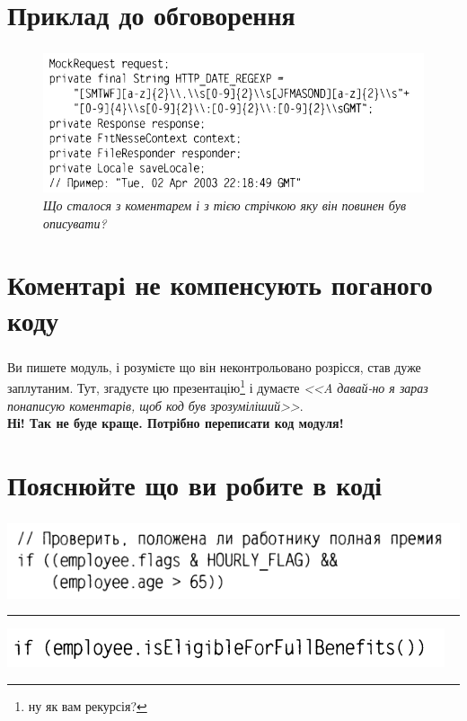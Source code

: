 \documentclass[12pt,pdf,utf8,ukrainian,aspectratio=169]{beamer}
\makeatletter
\newcommand*{\currentname}{\@currentlabelname}
\makeatother
\begin{document}
	\section{Приклад до обговорення} 
	\begin{frame}\frametitle{\currentname}
		\begin{figure}
			\includegraphics[scale=0.8]{clean_code_1.png} 
			\newline \newline
			\textit{Що сталося з коментарем і з тією стрічкою яку він повинен був описувати?}
		\end{figure}
	\end{frame}

	\section{Коментарі не компенсують поганого коду}
	\begin{frame}\frametitle{\currentname} 
		\begin{block}
			{\Large Ви пишете модуль, і розумієте що він не\-кон\-тро\-льо\-ва\-но розрісся, 
				став дуже заплутаним. Тут, згадуєте цю презентацію\footnote{ну як вам рекурсія?} 
				і думаєте \textit{<<A давай-но я зараз понаписую коментарів, щоб код був зрозуміліший>>}. \\ 
				\textbf{Ні! Так не буде краще. Потрібно переписати код модуля!}
			}
		\end{block}	
	\end{frame}
	
	\section{Пояснюйте \textbf{що} ви робите в коді}
	\begin{frame}\frametitle{\currentname}
			\includegraphics[scale=0.8]{clean_code_2_1.png}\hfill	
			\vfill	
			\noindent\rule{\textwidth}{1pt}
			\vfill
			\includegraphics[scale=0.8]{clean_code_2_2.png}\hfill
	\end{frame}
	
\end{document}

